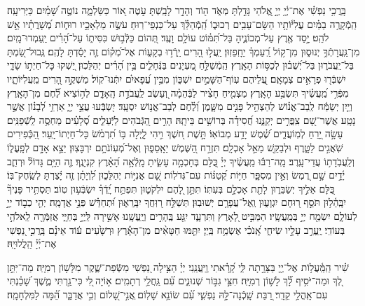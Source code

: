 \documentclass[twoside, openany, parskip=half, 11pt]{book}
\begin{document}
 בָּֽרֲכִ֥י נַפְשִׁ֗י
  אֶת־יְ֫יָ֥ יְיָ֣ אֱ֭לֹהַי גָּדַ֣לְתָּ מְּאֹ֑ד ה֖וֹד וְהָדָ֣ר לָבָֽשְׁתָּ׃ עֹ֣טֶה א֭וֹר כַּשַּׂלְמָ֑ה נוֹטֶ֣ה שָׁ֝מַ֗יִם כַּיְּרִיעָֽה׃ הַֽמְֿקָרֶ֥ה בַמַּ֗יִם עֲלִיּ֫וֹתָ֥יו הַשָּׂם־עָבִ֥ים רְכוּב֑וֹ הַֽ֝מְֿהַלֵּ֗ךְ עַל־כַּנְפֵי־רֽוּחַ׃ עֹשֶׂ֣ה מַלְאָכָ֣יו רוּח֑וֹת מְ֝שָׁרֲתָ֗יו אֵ֣שׁ לֹהֵֽט׃ יָ֣סַד אֶ֖רֶץ עַל־מְכוֹנֶ֑יהָ בַּל־תִּ֝מּ֗וֹט עוֹלָ֥ם וָעֶֽד׃ תְּ֭הוֹם כַּלְּֿב֣וּשׁ כִּסִּית֑וֹ עַל־הָ֝רִ֗ים יַֽעַמְדוּ־מָֽיִם׃ מִן־גַּֽעֲרָתְֿךָ֥ יְנוּס֑וּן מִן־ק֥וֹל רַֽ֝עַמְךָ֗ יֵחָֽפֵזֽוּן׃ יַֽעֲל֣וּ הָ֭רִים יֵֽרְֿד֣וּ בְקָע֑וֹת אֶל־מְ֝ק֗וֹם זֶ֤ה יָסַ֬דְתָּ לָהֶֽם׃ גְּֽבוּל־שַׂ֭מְתָּ בַּל־יַֽעֲבֹר֑וּן בַּל־יְ֝שֻׁב֗וּן לְכַסּ֥וֹת הָאָֽרֶץ׃ הַֽמְֿשַׁלֵּ֣חַ מַ֭עְיָנִים בַּנְּֿחָלִ֑ים בֵּ֥ין הָ֝רִ֗ים יְהַלֵּכֽוּן׃ יַ֭שְׁקוּ כָּל־חַיְת֣וֹ שָׂדָ֑י יִשְׁבְּֿר֖וּ פְרָאִ֣ים צְמָאָֽם׃ עֲ֭לֵיהֶם עֽוֹף־הַשָּׁמַ֣יִם יִשְׁכּ֑וֹן מִבֵּ֥ין עֳ֝פָאיִ֗ם יִתְּֿנוּ־קֽוֹל׃ מַשְׁקֶ֣ה הָ֭רִים מֵֽעֲלִיּוֹתָ֑יו מִפְּֿרִ֥י מַֽ֝עֲשֶׂ֗יךָ תִּשְׂבַּ֥ע הָאָֽרֶץ׃ מַצְמִ֤יחַ חָצִ֨יר לַבְּֿהֵמָ֗ה וְ֭עֵשֶׂב לַֽעֲבֹדַ֣ת הָֽאָדָ֑ם לְה֥וֹצִיא לֶ֝֗חֶם מִן־הָאָֽרֶץ׃ וְיַ֤יִן יְשַׂמַּ֬ח לְֽבַב־אֱנ֗וֹשׁ לְהַצְהִ֣יל פָּנִ֣ים מִשָּׁ֑מֶן וְ֝לֶ֗חֶם לְבַב־אֱנ֥וֹשׁ יִסְעָֽד׃ יִ֭שְׂבְּֿעוּ עֲצֵ֣י יְיָ֑ אַרְזֵ֥י לְ֝בָנ֗וֹן אֲשֶׁ֣ר נָטָֽע׃ אֲשֶׁר־שָׁ֭ם צִֽפֳּרִ֣ים יְקַנֵּ֑נוּ חֲ֝סִידָ֗ה בְּרוֹשִׁ֥ים בֵּיתָֽהּ׃ הָרִ֣ים הַ֭גְּֿבֹהִים לַיְּֿעֵלִ֑ים סְ֝לָעִ֗ים מַחְסֶ֥ה לַֽשְֿׁפַנִּֽים׃ עָשָׂ֣ה יָ֭רֵחַ לְמֽוֹעֲדִ֑ים שֶׁ֝֗מֶשׁ יָדַ֥ע מְבוֹאֽוֹ׃ תָּ֣שֶׁת ח֭שֶׁךְ וִ֣יהִי לָ֑יְלָה בּ֥וֹ תִ֝רְמֹ֗שׂ כָּל־חַיְתוֹ־יָֽעַר׃ הַ֭כְּֿפִירִים שֹֽׁאֲגִ֣ים לַטָּ֑רֶף וּלְבַקֵּ֖שׁ מֵאֵ֣ל אָכְלָֽם׃ תִּזְרַ֣ח הַ֭שֶּׁמֶשׁ יֵאָֽסֵפ֑וּן וְאֶל־מְ֝עֽוֹנֹתָ֥ם יִרְבָּצֽוּן׃ יֵצֵ֣א אָדָ֣ם לְפָֽעֳל֑וֹ וְלַֽעֲבֹֽדָת֥וֹ עֲדֵי־עָֽרֶב׃ מָֽה־רַבּ֬וּ מַֽעֲשֶׂ֨יךָ יְיָ֗ כֻּ֭לָּם בְּחָכְמָ֣ה עָשִׂ֑יתָ מָֽלְֿאָ֥ה הָ֝אָ֗רֶץ קִנְיָנֶֽךָ׃ זֶ֤ה הַיָּ֥ם גָּדוֹל֘ וּרְחַ֢ב יָ֫דָ֥יִם שָׁ֣ם רֶ֭מֶשׂ וְאֵ֣ין מִסְפָּ֑ר חַיּ֥וֹת קְ֝טַנּ֗וֹת עִם־גְּדֹלֽוֹת׃ שָׁ֭ם אֳנִיּ֣וֹת יְהַלֵּכ֑וּן לִ֝וְיָתָ֗ן זֶ֤ה יָ֬צַרְתָּ לְשַֽׂחֶק־בּֽוֹ׃ כֻּ֭לָּם אֵלֶ֣יךָ יְשַׂבֵּר֑וּן לָתֵ֖ת אָכְלָ֣ם בְּעִתּֽוֹ׃ תִּתֵּ֣ן לָ֭הֶם יִלְקֹט֑וּן תִּפְתַּ֥ח יָֽ֝דְֿךָ֗ יִשְׂבְּֿע֥וּן טֽוֹב׃ תַּסְתִּ֥יר פָּנֶיךָ֘ יִבָּֽהֵ֫ל֥וּן תֹּסֵ֣ף ר֭וּחָם יִגְוָע֑וּן וְֽאֶל־עֲפָרָ֥ם יְשׁוּבֽוּן׃ תְּשַׁלַּ֣ח ר֭וּֽחֲךָ יִבָּֽרֵא֑וּן וּ֝תְחַדֵּ֗שׁ פְּנֵ֣י אֲדָמָֽה׃ יְהִ֤י כְב֣וֹד יְיָ֣ לְעוֹלָ֑ם יִשְׂמַ֖ח יְיָ֣ בְּמַֽעֲשָֽׂיו׃ הַמַּבִּ֣יט לָ֭אָרֶץ וַתִּרְעָ֑ד יִגַּ֖ע בֶּֽהָרִ֣ים וְיֶֽעֱשָֽׁנוּ׃ אָשִׁ֣ירָה לַּֽיְיָ֣ בְּחַיָּ֑י אֲזַמְּֿרָ֖ה לֵֽאלֹהַ֣י בְּעוֹדִֽי׃ יֶֽעֱרַ֣ב עָלָ֣יו שִׂיחִ֑י אָֽ֝נֹכִ֗י אֶשְׂמַ֥ח בַּֽיְיָ׃ יִתַּ֤מּוּ חַטָּאִ֨ים מִן־הָאָ֡רֶץ וּרְשָׁ֙עִים ע֬וֹד אֵינָ֗ם בָּֽרֲכִ֣י נַ֭פְשִׁי אֶת־יְ֜יָ֗ הַֽלֲלוּיָֽהּ׃
 
שִׁ֗יר
 הַֽמַּֽ֫עֲל֥וֹת אֶל־יְ֖יָ בַּצָּרָ֣תָה לִּ֑י קָ֝רָ֗אתִי ֽוַיַּֽעֲנֵֽנִי׃ יְיָ֗ הַצִּ֣ילָה נַ֭פְשִׁי מִשְּֿׂפַת־שֶׁ֑קֶר מִלָּשׁ֥וֹן רְמִיָּֽה׃ מַה־יִּתֵּ֣ן לְ֭ךָ וּמַה־יֹּסִ֥יף לָ֝֗ךְ לָשׁ֥וֹן רְמִיָּֽה׃ חִצֵּ֣י גִבּ֣וֹר שְׁנוּנִ֑ים עִ֝֗ם גַּֽחֲלֵ֥י רְתָמִֽים׃ א֣וֹיָה ֖לִּי כִּי־גַ֣רְתִּי מֶ֑שֶׁךְ שָׁ֝כַ֗נְתִּי עִם־אָֽהֳלֵ֥י קֵדָֽר׃ רַ֭בַּת שָֽׁכְֿנָה־לָּ֣הּ נַפְשִׁ֑י עִ֝֗ם שׂוֹנֵ֥א שָׁלֽוֹם׃ ֽאֲנִ֣י־שָׁ֭לוֹם וְכִ֣י אֲדַבֵּ֑ר הֵ֝֗מָּה לַמִּלְחָמָֽה׃
\end{document}
